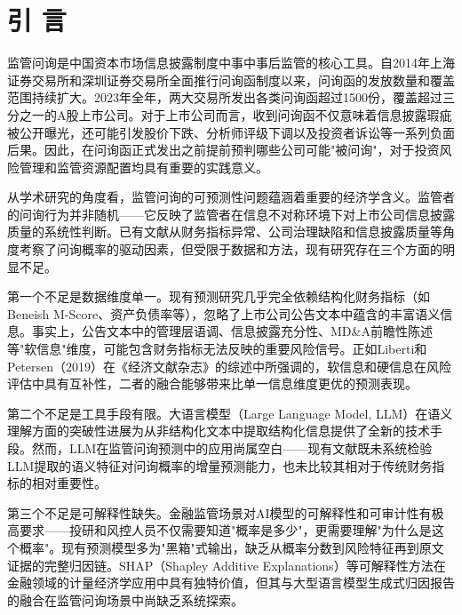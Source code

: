 
\section{引 言}

监管问询是中国资本市场信息披露制度中事中事后监管的核心工具。自2014年上海证券交易所和深圳证券交易所全面推行问询函制度以来，问询函的发放数量和覆盖范围持续扩大。2023年全年，两大交易所发出各类问询函超过1500份，覆盖超过三分之一的A股上市公司。对于上市公司而言，收到问询函不仅意味着信息披露瑕疵被公开曝光，还可能引发股价下跌\citep{chen2019supervision}、分析师评级下调\citep{wang2019analyst}以及投资者诉讼等一系列负面后果。因此，在问询函正式发出之前提前预判哪些公司可能"被问询"，对于投资风险管理和监管资源配置均具有重要的实践意义。

从学术研究的角度看，监管问询的可预测性问题蕴涵着重要的经济学含义。监管者的问询行为并非随机——它反映了监管者在信息不对称环境下对上市公司信息披露质量的系统性判断。已有文献从财务指标异常\citep{cassell2013review}、公司治理缺陷\citep{chen2019effective}和信息披露质量\citep{li2019inquiry}等角度考察了问询概率的驱动因素，但受限于数据和方法，现有研究存在三个方面的明显不足。

第一个不足是数据维度单一。现有预测研究几乎完全依赖结构化财务指标（如Beneish M-Score、资产负债率等），忽略了上市公司公告文本中蕴含的丰富语义信息。事实上，公告文本中的管理层语调、信息披露充分性、MD\&A前瞻性陈述等"软信息"维度，可能包含财务指标无法反映的重要风险信号。正如Liberti和Petersen（2019）在《经济文献杂志》的综述中所强调的，软信息和硬信息在风险评估中具有互补性，二者的融合能够带来比单一信息维度更优的预测表现\citep{liberti2019information}。

第二个不足是工具手段有限。大语言模型（Large Language Model, LLM）在语义理解方面的突破性进展为从非结构化文本中提取结构化信息提供了全新的技术手段\citep{huang2023finbert}。然而，LLM在监管问询预测中的应用尚属空白——现有文献既未系统检验LLM提取的语义特征对问询概率的增量预测能力，也未比较其相对于传统财务指标的相对重要性。

第三个不足是可解释性缺失。金融监管场景对AI模型的可解释性和可审计性有极高要求——投研和风控人员不仅需要知道"概率是多少"，更需要理解"为什么是这个概率"。现有预测模型多为"黑箱"式输出，缺乏从概率分数到风险特征再到原文证据的完整归因链。SHAP（Shapley Additive Explanations）等可解释性方法在金融领域的计量经济学应用中具有独特价值\citep{lu2023ml}，但其与大型语言模型生成式归因报告的融合在监管问询场景中尚缺乏系统探索。

